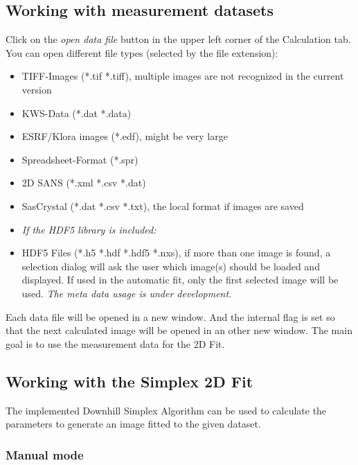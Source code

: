 \documentclass[11pt]{article} %
\begin{document}
\subsection{Working with measurement datasets}

Click on the {\it open data file} button in the upper left corner of the Calculation tab. You can open different file types (selected by the file extension):
	\begin{itemize}\itemsep0pt
	\item TIFF-Images (*.tif *.tiff), multiple images are not recognized in the current version
	\item KWS-Data (*.dat *.data)
	\item ESRF/Klora images (*.edf), might be very large
	\item Spreadsheet-Format (*.spr)
	\item 2D SANS (*.xml *.csv *.dat)
	\item SasCrystal (*.dat *.csv *.txt), the local format if images are saved
	\item[] {\it If the HDF5 library is included:}
	\item HDF5 Files (*.h5 *.hdf *.hdf5 *.nxs), if more than one image is found, a selection dialog will ask the user which image(s) should be loaded and displayed. If used in the automatic fit, only the first selected image will be used. {\it The meta data usage is under development.}
	\end{itemize}
Each data file will be opened in a new window. And the internal flag is set so that the next calculated image will be opened in an other new window. The main goal is to use the measurement data for the 2D Fit.

\subsection{Working with the Simplex 2D Fit}

The implemented Downhill Simplex Algorithm can be used to calculate the parameters to generate an image fitted to the given dataset.

\subsubsection{Manual mode}
\end{document}
